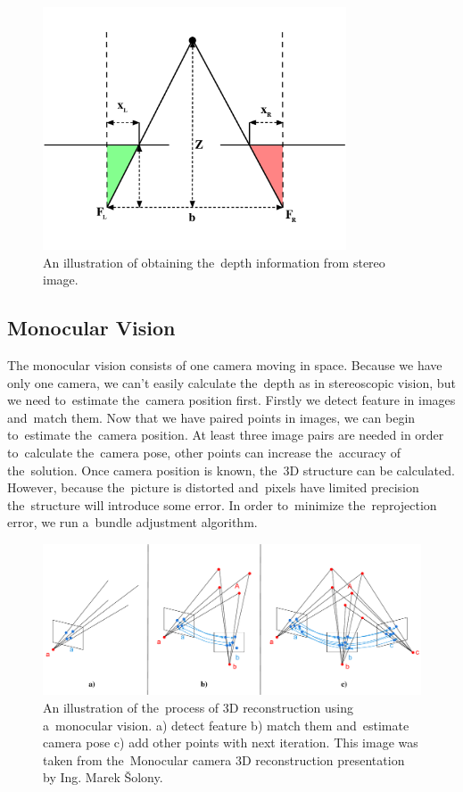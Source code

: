 \begin{figure}[ht]
	\begin{center}
		\includegraphics[keepaspectratio,width=9cm]{fig/stereo.pdf}
	\end{center}
	\caption{An illustration of obtaining the~depth information from stereo image.}
	\label{fig:stereo}
\end{figure}

\subsection*{Monocular Vision}
The monocular vision consists of one camera moving in space. Because we have only one camera, we can't easily calculate the~depth as in stereoscopic vision, but we need to~estimate the~camera position first. Firstly we detect feature in images and~match them. Now that we have paired points in images, we can begin to~estimate the~camera position. At least three image pairs are needed in order to~calculate the~camera pose, other points can increase the~accuracy of the~solution. Once camera position is known, the~3D structure can be calculated. However, because the~picture is distorted and~pixels have limited precision the~structure will introduce some error. In order to~minimize the~reprojection error, we run a~bundle adjustment algorithm.

\begin{figure}[ht]
	\begin{center}
		\includegraphics[keepaspectratio,width=\textwidth]{fig/mono.pdf}
	\end{center}
	\caption{An illustration of the~process of 3D reconstruction using a~monocular vision. a) detect feature b) match them and~estimate camera pose c) add other points with next iteration. This image was taken from the~Monocular camera 3D reconstruction presentation by Ing. Marek Šolony.}
	\label{fig:mono}
\end{figure}

